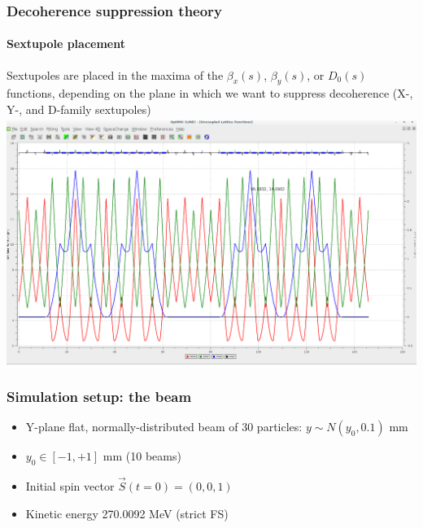 \documentclass{beamer}
\begin{document}
\begin{frame}\frametitle{Decoherence suppression theory}\framesubtitle{Sextupole placement}
  Sextupoles are placed in the maxima of the $\beta_x(s)$, $\beta_y(s)$, or $D_0(s)$ functions, depending on the plane in which we want to suppress decoherence (X-, Y-, and D-family sextupoles)
  \centering
  \includegraphics[width=\linewidth]{BNLFS_lattice_betas_optim}
\end{frame}

\begin{frame}\frametitle{Simulation setup: the beam}
  \begin{itemize}
  \item Y-plane flat, normally-distributed beam of 30 particles: $y\sim N(y_0, 0.1)$ mm
  \item $y_0 \in [-1, +1]$ mm (10 beams)
  \item Initial spin vector $\vec S(t=0) = (0,0,1)$
  \item Kinetic energy 270.0092 MeV (strict FS)
  \end{itemize}
\end{frame}
\end{document}
